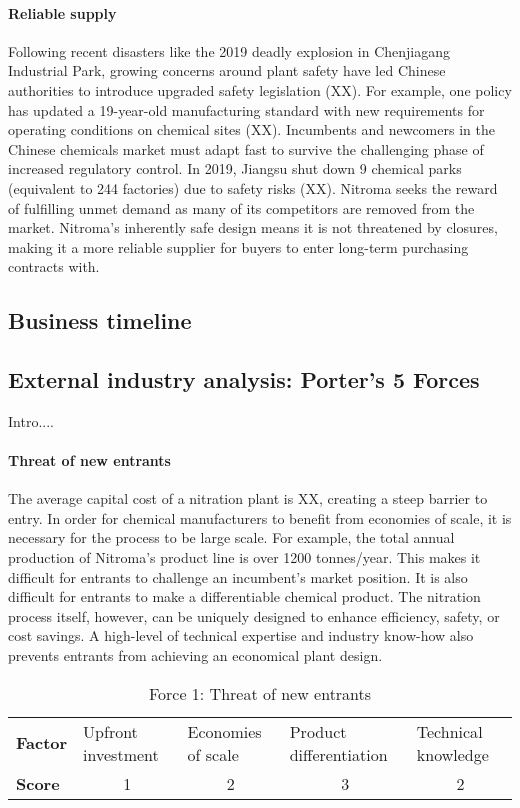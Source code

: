 \paragraph{Reliable supply}
Following recent disasters like the 2019 deadly explosion in Chenjiagang Industrial Park, growing concerns around plant safety have led Chinese authorities to introduce upgraded safety legislation (XX). For example, one policy has updated a 19-year-old manufacturing standard with new requirements for operating conditions on chemical sites (XX). Incumbents and newcomers in the Chinese chemicals market must adapt fast to survive the challenging phase of increased regulatory control. In 2019, Jiangsu shut down 9 chemical parks (equivalent to 244 factories) due to safety risks (XX). Nitroma seeks the reward of fulfilling unmet demand as many of its competitors are removed from the market. Nitroma’s inherently safe design means it is not threatened by closures, making it a more reliable supplier for buyers to enter long-term purchasing contracts with.

\subsection{Business timeline}
\subsection{External industry analysis: Porter's 5 Forces}
Intro....
\paragraph{Threat of new entrants}
The average capital cost of a nitration plant is XX, creating a steep barrier to entry. In order for chemical manufacturers to benefit from economies of scale, it is necessary for the process to be large scale. For example, the total annual production of Nitroma’s product line is over 1200 tonnes/year. This makes it difficult for entrants to challenge an incumbent’s market position. It is also difficult for entrants to make a differentiable chemical product. The nitration process itself, however, can be uniquely designed to enhance efficiency, safety, or cost savings. A high-level of technical expertise and industry know-how also prevents entrants from achieving an economical plant design. 

\begin{table}[H]
\centering
    \caption{Force 1: Threat of new entrants}
    \label{tab:force1}\footnotesize
{}
\begin{tabular}{lllll}
\hline
\textbf{Factor} & Upfront investment    & Economies of scale    & Product differentiation & Technical knowledge   \\
\textbf{Score}  & \multicolumn{1}{c}{1} & \multicolumn{1}{c}{2} & \multicolumn{1}{c}{3}   & \multicolumn{1}{c}{2} \\ \hline
\end{tabular}
\end{table}

